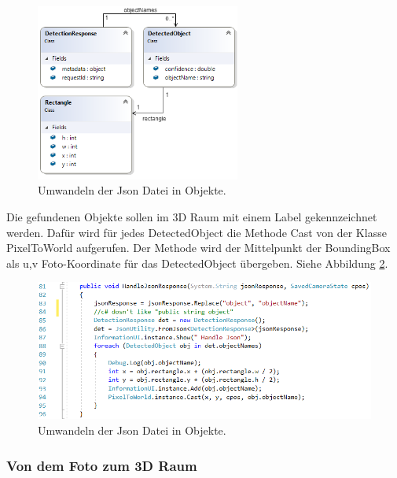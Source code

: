 \begin{figure}[H]
	\centering
	\includegraphics[width=0.6\textwidth]{images/dia_json.PNG}
	\caption[]{Umwandeln der Json Datei in Objekte.}
	\label{dia:jsonClasses}
\end{figure}

Die gefundenen Objekte sollen im 3D Raum mit einem Label gekennzeichnet werden. 
Dafür wird für jedes DetectedObject die Methode Cast von der Klasse PixelToWorld aufgerufen. Der Methode wird der Mittelpunkt der BoundingBox als u,v Foto-Koordinate für das DetectedObject übergeben. Siehe Abbildung \ref{code:handlejson}.

\begin{figure}[H]
	\centering
	\includegraphics[width=1\textwidth]{images/code_handleJson.PNG}
	\caption[]{Umwandeln der Json Datei in Objekte.}
	\label{code:handlejson}
\end{figure}

\subsubsection{Von dem Foto zum 3D Raum}

